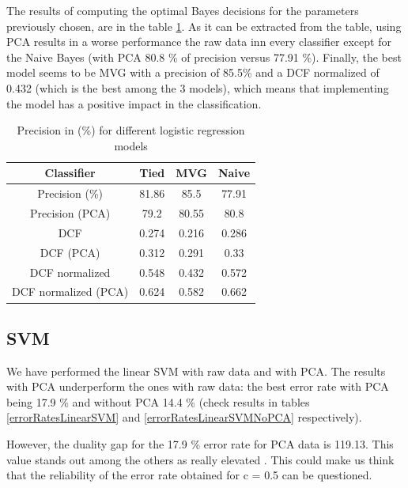 \documentclass[twoside,a4paper,12pt]{report}
\begin{document}
The results of computing the optimal Bayes decisions for the parameters previously chosen,
are in the table \ref{errorRatesConfusionMatrix}. As it can be extracted from the table,
using PCA results in a worse performance the raw data inn every classifier except for the
Naive Bayes (with PCA 80.8 \% of precision versus 77.91 \%). 
Finally, the best model seems to be MVG with a precision of 85.5\% and a DCF normalized
of 0.432 (which is the best among the 3 models), which means that implementing the model has 
a positive impact in the classification.


\begin{table}[H]
    \centering
     \begin{tabular}{||c c c c||} 
        \hline \hline
        Classifier & Tied & MVG  & Naive \\
        \hline\hline
        Precision (\%) &  81.86 & \cellcolor{blue!25}  85.5 & 77.91  \\ 
        \hline
        Precision (PCA)  &  79.2 &  80.55 & 80.8 \\ 
        \hline
        DCF &  0.274 &  0.216 & 0.286  \\   
        \hline
        DCF (PCA)  &  0.312 &  0.291 & 0.33  \\   
        \hline
        DCF normalized &  0.548 &\cellcolor{blue!25}  0.432 & 0.572  \\ 
        \hline
        DCF normalized (PCA)  &  0.624 &  0.582 & 0.662    \\ 
        \hline \hline
    \end{tabular}
    
    \caption{Precision in (\%) for different logistic regression models \label{errorRatesConfusionMatrix}}
\end{table}


\subsection{SVM}

We have performed the linear SVM with raw data and with PCA. The results
with PCA underperform the ones with raw data: the best error rate with PCA being
17.9 \% and without PCA 14.4 \% (check results in tables \ref{errorRatesLinearSVM} and \ref{errorRatesLinearSVMNoPCA} respectively).

However, the duality gap for the 17.9 \% error rate for PCA data is 119.13. This
value stands out among the others as really elevated . This could make us think 
that the reliability of the error rate obtained for c = 0.5 can be questioned.
\end{document}
